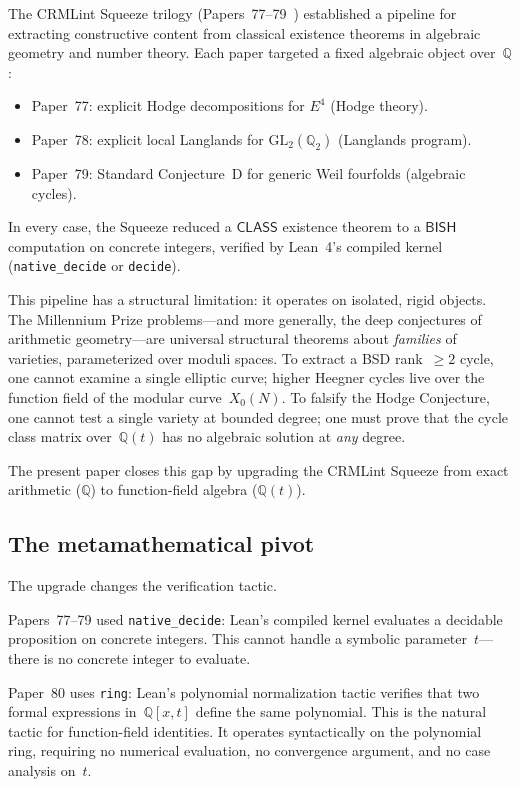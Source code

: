 \documentclass[11pt]{article}
\theoremstyle{plain}
\theoremstyle{definition}
\theoremstyle{remark}
\newcommand{\Q}{\mathbb{Q}}
\newcommand{\GL}{\mathrm{GL}}
\newcommand{\BISH}{\mathsf{BISH}}
\newcommand{\CLASS}{\mathsf{CLASS}}
\begin{document}
The CRMLint Squeeze trilogy (Papers~77--79~\cite{Paper77,Paper78,Paper79})
established a pipeline for extracting constructive content from
classical existence theorems in algebraic geometry and number theory.
Each paper targeted a fixed algebraic object over~$\Q$:
\begin{itemize}[nosep]
\item Paper~77: explicit Hodge decompositions for $E^4$ (Hodge theory).
\item Paper~78: explicit local Langlands for $\GL_2(\Q_2)$ (Langlands program).
\item Paper~79: Standard Conjecture~D for generic Weil fourfolds (algebraic cycles).
\end{itemize}
In every case, the Squeeze reduced a $\CLASS$ existence theorem to a
$\BISH$ computation on concrete integers, verified by Lean~4's compiled
kernel (\texttt{native\_decide} or \texttt{decide}).

This pipeline has a structural limitation: it operates on isolated,
rigid objects.  The Millennium Prize problems---and more generally,
the deep conjectures of arithmetic geometry---are universal structural
theorems about \emph{families} of varieties, parameterized over
moduli spaces.  To extract a BSD rank~$\geq 2$ cycle, one cannot
examine a single elliptic curve; higher Heegner cycles live over
the function field of the modular curve~$X_0(N)$.  To falsify the
Hodge Conjecture, one cannot test a single variety at bounded
degree; one must prove that the cycle class matrix over~$\Q(t)$
has no algebraic solution at \emph{any} degree.

The present paper closes this gap by upgrading the CRMLint Squeeze
from exact arithmetic ($\Q$) to function-field algebra ($\Q(t)$).

\subsection{The metamathematical pivot}

The upgrade changes the verification tactic.

Papers~77--79 used \texttt{native\_decide}: Lean's compiled kernel
evaluates a decidable proposition on concrete integers.  This cannot
handle a symbolic parameter~$t$---there is no concrete integer to evaluate.

Paper~80 uses \texttt{ring}: Lean's polynomial normalization tactic
verifies that two formal expressions in~$\Q[x, t]$ define the same
polynomial.  This is the natural tactic for function-field identities.
It operates syntactically on the polynomial ring, requiring no numerical
evaluation, no convergence argument, and no case analysis on~$t$.
\end{document}
